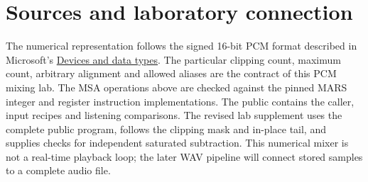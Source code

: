 \section*{Sources and laboratory connection}
The numerical representation follows the signed 16-bit PCM format described in
Microsoft's \href{https://learn.microsoft.com/en-us/windows/win32/multimedia/devices-and-data-types}{Devices and data types}.
The particular clipping count, maximum count, arbitrary alignment and allowed
aliases are the contract of this PCM mixing lab. The MSA operations above are checked against the
pinned MARS integer and register instruction implementations. The public
 contains the caller, input recipes and listening
comparisons. The revised lab supplement uses the complete public program, follows the clipping
mask and in-place tail, and supplies checks for independent saturated subtraction.
This numerical mixer is not a real-time playback loop; the later WAV pipeline
will connect stored samples to a complete audio file.
